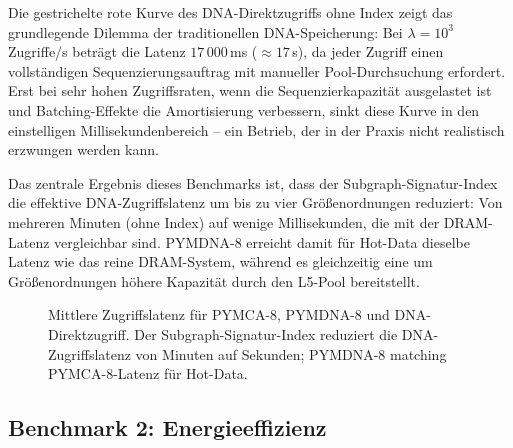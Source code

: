 ﻿\documentclass[a4paper,12pt]{article}
\theoremstyle{definition}
\begin{document}
Die gestrichelte rote Kurve des DNA-Direktzugriffs ohne Index zeigt das grundlegende Dilemma der traditionellen DNA-Speicherung: Bei $\lambda = 10^3$\,Zugriffe/s beträgt die Latenz $17\,000$\,ms ($\approx 17$\,s), da jeder Zugriff einen vollständigen Sequenzierungsauftrag mit manueller Pool-Durchsuchung erfordert. Erst bei sehr hohen Zugriffsraten, wenn die Sequenzierkapazität ausgelastet ist und Batching-Effekte die Amortisierung verbessern, sinkt diese Kurve in den einstelligen Millisekundenbereich -- ein Betrieb, der in der Praxis nicht realistisch erzwungen werden kann.

Das zentrale Ergebnis dieses Benchmarks ist, dass der Subgraph-Signatur-Index die effektive DNA-Zugriffslatenz um bis zu vier Größenordnungen reduziert: Von mehreren Minuten (ohne Index) auf wenige Millisekunden, die mit der DRAM-Latenz vergleichbar sind. PYMDNA-8 erreicht damit für Hot-Data dieselbe Latenz wie das reine DRAM-System, während es gleichzeitig eine um Größenordnungen höhere Kapazität durch den L5-Pool bereitstellt.

\begin{figure}[H]
  \centering
  \caption{Mittlere Zugriffslatenz für PYMCA-8, PYMDNA-8 und DNA-Direktzugriff.
    Der Subgraph-Signatur-Index reduziert die DNA-Zugriffslatenz von
    Minuten auf Sekunden; PYMDNA-8 matching PYMCA-8-Latenz für Hot-Data.}
  \label{fig:latenz_vergleich}
\end{figure}

\subsection{Benchmark 2: Energieeffizienz}
\end{document}
